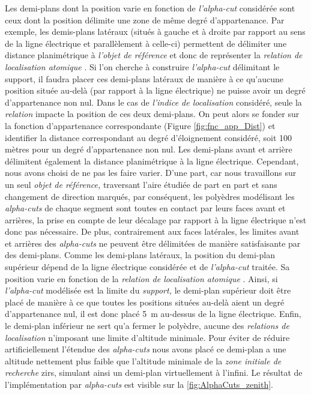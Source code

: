 Les demi-plans dont la position varie en fonction de
\emph{l'alpha-cut} considérée sont ceux dont la position délimite une
zone de même degré d'appartenance. Par exemple, les demis-plans
latéraux (\ie situés à gauche et à droite par rapport au sens de la
ligne électrique et parallèlement à celle-ci) permettent de délimiter
une distance planimétrique à \emph{l'objet de référence} et donc de
représenter la \emph{relation de localisation atomique}
. Si l'on cherche à construire \emph{l'alpha-cut}
délimitant le support, il faudra placer ces demi-plans latéraux de
manière à ce qu'aucune position située au-delà (par rapport à la ligne
électrique) ne puisse avoir un degré d'appartenance non nul. Dans le
cas de \emph{l'indice de localisation} considéré, seule la
\emph{relation}  impacte la position de ces deux
demi-plans. On peut alors se fonder sur la fonction d'appartenance
correspondante (Figure \ref{fig:fnc_app_Dist}) et identifier la
distance correspondant au degré d'éloignement considéré, soit 100
mètres pour un degré d'appartenance non nul. Les demi-plans avant et
arrière délimitent également la distance planimétrique à la ligne
électrique. Cependant, nous avons choisi de ne pas les faire
varier. D'une part, car nous travaillons sur un seul \emph{objet de
  référence,} traversant l'aire étudiée de part en part et sans
changement de direction marqués, par conséquent, les polyèdres
modélisant les \emph{alpha-cuts} de chaque segment sont toutes en
contact par leurs faces avant et arrières, la prise en compte de leur
décalage par rapport à la ligne électrique n'est donc pas
nécessaire. De plus, contrairement aux faces latérales, les limites
avant et arrières des \emph{alpha-cuts} ne peuvent être délimitées de
manière satisfaisante par des demi-plans.
% 
Comme les demi-plans latéraux, la position du demi-plan supérieur
dépend de la ligne électrique considérée et de \emph{l'alpha-cut}
traitée. Sa position varie en fonction de la \emph{relation de
  localisation atomique}
. Ainsi,
si \emph{l'alpha-cut} modélisée est la limite du \emph{support,} le
demi-plan supérieur doit être placé de manière à ce que toutes les
positions situées au-delà aient un degré d'appartenance nul, il est
donc placé \SI{5}{\meter} au-dessus de la ligne électrique.  Enfin, le
demi-plan inférieur ne sert qu'a fermer le polyèdre, aucune des
\emph{relations de localisation} n'imposant une limite d'altitude
minimale. Pour éviter de réduire artificiellement l'étendue des
\emph{alpha-cuts} nous avons placé ce demi-plan a une altitude
nettement plus faible que l'altitude minimale de la \emph{zone
  initiale de recherche} \acp{zir}, simulant ainsi un demi-plan
virtuellement à l'infini. Le résultat de l'implémentation par
\emph{alpha-cuts} est visible sur la \autoref{fig:AlphaCuts_zenith}.

